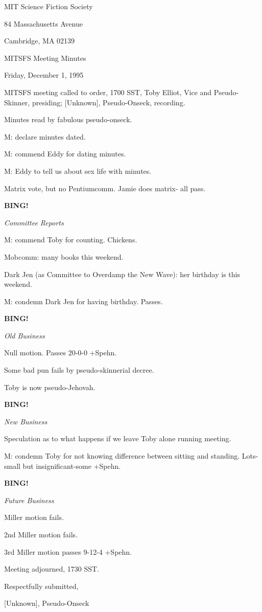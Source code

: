\documentclass[12pt]{article}
\newcommand{\bing}{{\bf BING!} }
\newcommand{\goto}[1]{\bing \vskip 12pt \centerline{{\em{#1}}}}
\begin{document}
\begin{center}

MIT Science Fiction Society 

84 Massachusetts Avenue

Cambridge, MA 02139

\vspace{12pt}

MITSFS Meeting Minutes 

Friday, December 1, 1995

\end{center}
 
\vspace{18pt}

\setlength{\parskip}{6pt}

\noindent
MITSFS meeting called to order, 1700 SST,
Toby Elliot, Vice and Pseudo-Skinner, presiding; [Unknown], Pseudo-Onseck, recording.

Minutes read by fabulous pseudo-onseck.

M: declare minutes dated.

M: commend Eddy for dating minutes.

M: Eddy to tell us about sex life with minutes.

Matrix vote, but no Pentiumcomm. Jamie does matrix- all pass.

\goto{Committee Reports}

M: commend Toby for counting. Chickens.

Mobcomm: many books this weekend.

Dark Jen (as Committee to Overdamp the New Wave): her birthday is this weekend.

M: condemn Dark Jen for having birthday. Passes.

\goto{Old Business}

Null motion. Passes 20-0-0 +Spehn.

Some bad pun fails by pseudo-skinnerial decree.

Toby is now pseudo-Jehovah.

\goto{New Business}

Speculation as to what happens if we leave Toby alone running meeting.

M: condemn Toby for not knowing difference between sitting and standing. Lots-small but insignificant-some +Spehn.

\goto{Future Business}

Miller motion fails.

2nd Miller motion fails.

3rd Miller motion passes 9-12-4 +Spehn.

\vspace{12pt}

\noindent
Meeting adjourned, 1730 SST.

\vspace{18pt}

\centerline{Respectfully submitted,}
\centerline{[Unknown], Pseudo-Onseck}
\end{document}
